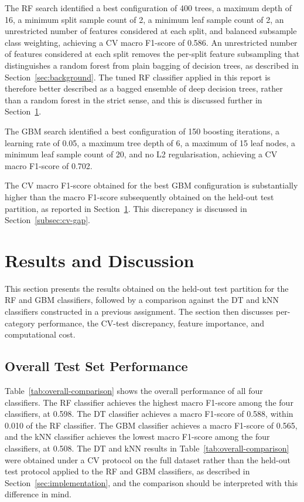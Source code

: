 \documentclass[conference,10pt]{IEEEtran}
\begin{document}
The RF search identified a best configuration of 400 trees, a maximum depth of 16, a minimum split sample count of 2, a minimum leaf sample count of 2, an unrestricted number of features considered at each split, and balanced subsample class weighting, achieving a CV macro F1-score of 0.586. An unrestricted number of features considered at each split removes the per-split feature subsampling that distinguishes a random forest from plain bagging of decision trees, as described in Section~\ref{sec:background}. The tuned RF classifier applied in this report is therefore better described as a bagged ensemble of deep decision trees, rather than a random forest in the strict sense, and this is discussed further in Section~\ref{sec:results}.

The GBM search identified a best configuration of 150 boosting iterations, a learning rate of 0.05, a maximum tree depth of 6, a maximum of 15 leaf nodes, a minimum leaf sample count of 20, and no L2 regularisation, achieving a CV macro F1-score of 0.702.

The CV macro F1-score obtained for the best GBM configuration is substantially higher than the macro F1-score subsequently obtained on the held-out test partition, as reported in Section~\ref{sec:results}. This discrepancy is discussed in Section~\ref{subsec:cv-gap}.

\section{Results and Discussion}
\label{sec:results}
This section presents the results obtained on the held-out test partition for the RF and GBM classifiers, followed by a comparison against the DT and kNN classifiers constructed in a previous assignment. The section then discusses per-category performance, the CV-test discrepancy, feature importance, and computational cost.

\subsection{Overall Test Set Performance}
Table~\ref{tab:overall-comparison} shows the overall performance of all four classifiers. The RF classifier achieves the highest macro F1-score among the four classifiers, at 0.598. The DT classifier achieves a macro F1-score of 0.588, within 0.010 of the RF classifier. The GBM classifier achieves a macro F1-score of 0.565, and the kNN classifier achieves the lowest macro F1-score among the four classifiers, at 0.508. The DT and kNN results in Table~\ref{tab:overall-comparison} were obtained under a CV protocol on the full dataset rather than the held-out test protocol applied to the RF and GBM classifiers, as described in Section~\ref{sec:implementation}, and the comparison should be interpreted with this difference in mind.
\end{document}
